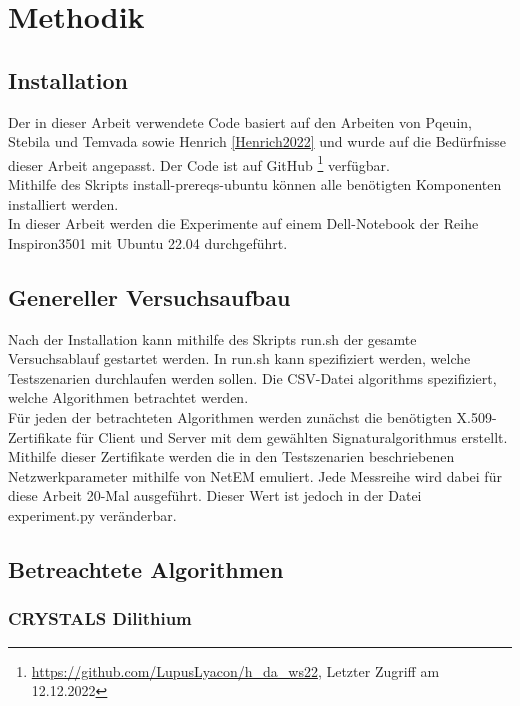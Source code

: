 \chapter{Methodik}
\label{ch:methodik}

	\section{Installation}
	\label{sec:methodik:installation}
	Der in dieser Arbeit verwendete Code basiert auf den Arbeiten von Pqeuin, Stebila und Temvada \cite{Paquin2020} sowie Henrich \ref{Henrich2022} und wurde auf die Bedürfnisse dieser Arbeit angepasst. Der Code ist auf GitHub \footnote{\url{https://github.com/LupusLyacon/h_da_ws22}, Letzter Zugriff am 12.12.2022} verfügbar.\\
	
	Mithilfe des Skripts install-prereqs-ubuntu können alle benötigten Komponenten installiert werden.\\
	
	In dieser Arbeit werden die Experimente auf einem Dell-Notebook der Reihe Inspiron3501 mit Ubuntu 22.04 durchgeführt.

	\section{Genereller Versuchsaufbau}
	\label{sec:methodik:aufbau}
	
	Nach der Installation kann mithilfe des Skripts run.sh der gesamte Versuchsablauf gestartet werden. In run.sh kann spezifiziert werden, welche Testszenarien durchlaufen werden sollen. Die CSV-Datei algorithms spezifiziert, welche Algorithmen betrachtet werden.\\
	
	Für jeden der betrachteten Algorithmen werden zunächst die benötigten X.509-Zertifikate für Client und Server mit dem gewählten Signaturalgorithmus erstellt. Mithilfe dieser Zertifikate werden die in den Testszenarien beschriebenen Netzwerkparameter mithilfe von NetEM emuliert. Jede Messreihe wird dabei für diese Arbeit 20-Mal ausgeführt. Dieser Wert ist jedoch in der Datei experiment.py veränderbar.
	
	\section{Betreachtete Algorithmen}
	\label{sec:methodik:alg}
	
		\subsection{CRYSTALS Dilithium}
		\label{subsec:methodik:alg:dilithium}
		
